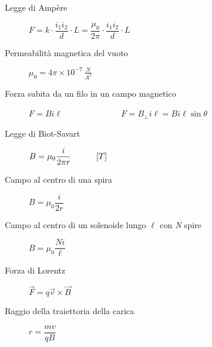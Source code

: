 \documentclass[a4paper,11pt,italian]{article}
\begin{document}
\begin{description}
  \item[Legge di Ampère]
  $ F = k\cdot  \dfrac{i_1 i_2}{d}\cdot L = \dfrac{\mu_0}{2\pi} \cdot \dfrac{i_1 i_2}{d}\cdot L $
  
  \item[Permeabilità magnetica del vuoto]
  $ \mu_0 = 4\pi \times 10^{-7} \, \frac{N}{A^2} $
  
  \item[Forza subita da un filo in un campo magnetico] 
  $ F = Bi\ell $~~~~~~~~~~~~~~$ F = B_{\perp } i\ell = Bi\ell\sin\theta$
  
  
  \item[Legge di Biot-Savart] 
  $ B = \mu_0\dfrac{i}{2\pi r} \hspace*{3em} [T] $

  \item[Campo al centro di una spira]
  $ B = \mu_0 \dfrac{i}{2r} $
  
  \item[Campo al centro di un solenoide lungo $ \ell $ con \textit{N} spire]
  $ B = \mu_0 \dfrac{Ni}{\ell}$
  
  \item[Forza di Lorentz] 
  $ \vec{F} = q \vec{v} \times \vec{B} $
%   
  \item[Raggio della traiettoria della carica] 
  $ r = \dfrac{mv}{qB} $


\end{description}
\end{document}
